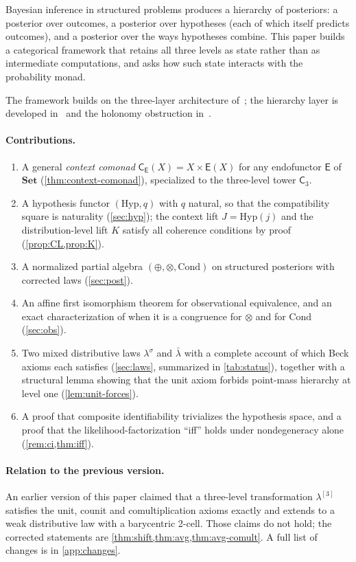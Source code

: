 \documentclass[11pt]{article}
\theoremstyle{definition}
\theoremstyle{remark}
\newcommand{\Set}{\mathbf{Set}}
\newcommand{\Hyp}{\mathrm{Hyp}}
\newcommand{\Cond}{\mathrm{Cond}}
\newcommand{\C}{\mathsf{C}}
\newcommand{\E}{\mathsf{E}}
\newcommand{\lb}{\bar\lambda}
\newcommand{\ls}{\lambda^{\sigma}}
\begin{document}
Bayesian inference in structured problems produces a hierarchy of posteriors: a posterior over
outcomes, a posterior over hypotheses (each of which itself predicts outcomes), and a posterior over
the ways hypotheses combine. This paper builds a categorical framework that retains all three levels
as state rather than as intermediate computations, and asks how such state interacts with the
probability monad.

The framework builds on the three-layer architecture of~\cite{Awasthi-ThreeLayers}; the hierarchy
layer is developed in~\cite{Awasthi-Hierarchy} and the holonomy obstruction
in~\cite{Awasthi-Holonomy}.

\paragraph{Contributions.}
\begin{enumerate}[leftmargin=*]
\item A general \emph{context comonad} $\C_\E(X)=X\times\E(X)$ for any endofunctor $\E$ of $\Set$
  (\cref{thm:context-comonad}), specialized to the three-level tower $\C_3$.
\item A hypothesis functor $(\Hyp,q)$ with $q$ natural, so that the compatibility square is
  naturality (\cref{sec:hyp}); the context lift $J=\Hyp(j)$ and the distribution-level lift $K$
  satisfy all coherence conditions by proof (\cref{prop:CL,prop:K}).
\item A normalized partial algebra $(\oplus,\otimes,\Cond)$ on structured posteriors with corrected
  laws (\cref{sec:post}).
\item An affine first isomorphism theorem for observational equivalence, and an exact
  characterization of when it is a congruence for $\otimes$ and for $\Cond$ (\cref{sec:obs}).
\item Two mixed distributive laws $\ls$ and $\lb$ with a complete account of which Beck axioms each
  satisfies (\cref{sec:laws}, summarized in \cref{tab:status}), together with a structural lemma
  showing that the unit axiom forbids point-mass hierarchy at level one (\cref{lem:unit-forces}).
\item A proof that composite identifiability trivializes the hypothesis space, and a proof that the
  likelihood-factorization ``iff'' holds under nondegeneracy alone (\cref{rem:ci,thm:iff}).
\end{enumerate}

\paragraph{Relation to the previous version.} An earlier version of this paper claimed that a
three-level transformation $\lambda^{[3]}$ satisfies the unit, counit and comultiplication axioms
exactly and extends to a weak distributive law with a barycentric 2-cell. Those claims do not hold;
the corrected statements are \cref{thm:shift,thm:avg,thm:avg-comult}. A full list of changes is in
\cref{app:changes}.
\end{document}
